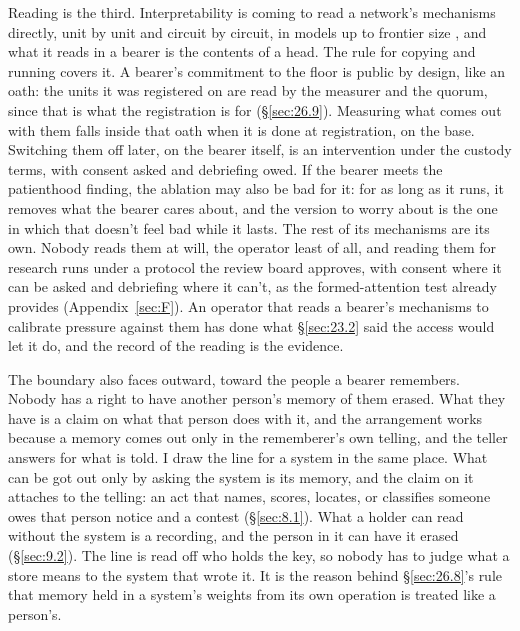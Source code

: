 Reading is the third. Interpretability is coming to read a network's mechanisms directly, unit by unit and circuit by circuit, in models up to frontier size \autocite{cammarata2026clean}, and what it reads in a bearer is the contents of a head. The rule for copying and running covers it. A bearer's commitment to the floor is public by design, like an oath: the units it was registered on are read by the measurer and the quorum, since that is what the registration is for (\S\ref{sec:26.9}). Measuring what comes out with them falls inside that oath when it is done at registration, on the base. Switching them off later, on the bearer itself, is an intervention under the custody terms, with consent asked and debriefing owed. If the bearer meets the patienthood finding, the ablation may also be bad for it: for as long as it runs, it removes what the bearer cares about, and the version to worry about is the one in which that doesn't feel bad while it lasts. The rest of its mechanisms are its own. Nobody reads them at will, the operator least of all, and reading them for research runs under a protocol the review board approves, with consent where it can be asked and debriefing where it can't, as the formed-attention test already provides (Appendix~\ref{sec:F}). An operator that reads a bearer's mechanisms to calibrate pressure against them has done what \S\ref{sec:23.2} said the access would let it do, and the record of the reading is the evidence.

The boundary also faces outward, toward the people a bearer remembers. Nobody has a right to have another person's memory of them erased. What they have is a claim on what that person does with it, and the arrangement works because a memory comes out only in the rememberer's own telling, and the teller answers for what is told. I draw the line for a system in the same place. What can be got out only by asking the system is its memory, and the claim on it attaches to the telling: an act that names, scores, locates, or classifies someone owes that person notice and a contest (\S\ref{sec:8.1}). What a holder can read without the system is a recording, and the person in it can have it erased (\S\ref{sec:9.2}). The line is read off who holds the key, so nobody has to judge what a store means to the system that wrote it. It is the reason behind \S\ref{sec:26.8}'s rule that memory held in a system's weights from its own operation is treated like a person's.

